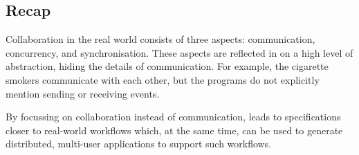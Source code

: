 \subsection{Recap}

Collaboration in the real world consists of three aspects: communication, concurrency, and synchronisation.
These aspects are reflected in \TOP on a high level of abstraction, hiding the details of communication.
For example, the cigarette smokers communicate with each other, but the programs do not explicitly mention sending or receiving events.

By focussing on collaboration instead of communication, \TOP leads to specifications closer to real-world workflows which, at the same time, can be used to generate distributed, multi-user applications to support such workflows.
